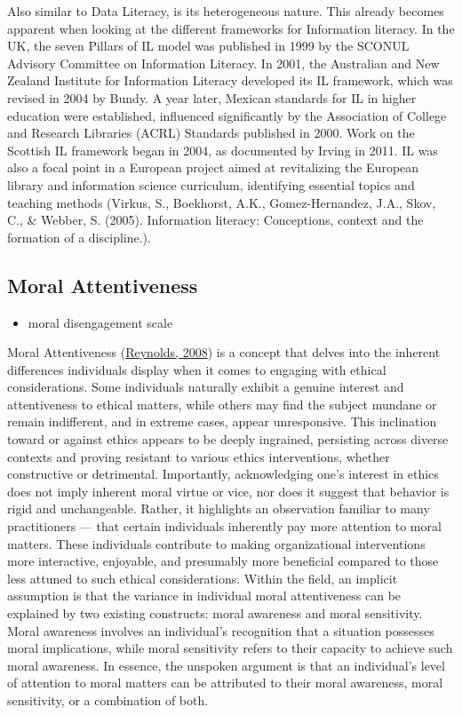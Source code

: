 \documentclass[
  12pt,
  a4paper,
  twoside]{article}
\providecommand{\tightlist}{%
  \setlength{\itemsep}{0pt}\setlength{\parskip}{0pt}}
\begin{document}
Also similar to Data Literacy, is its heterogeneous nature. This already becomes apparent when looking at the different frameworks for Information literacy. In the UK, the seven Pillars of IL model was published in 1999 by the SCONUL Advisory Committee on Information Literacy. In 2001, the Australian and New Zealand Institute for Information Literacy developed its IL framework, which was revised in 2004 by Bundy. A year later, Mexican standards for IL in higher education were established, influenced significantly by the Association of College and Research Libraries (ACRL) Standards published in 2000. Work on the Scottish IL framework began in 2004, as documented by Irving in 2011. IL was also a focal point in a European project aimed at revitalizing the European library and information science curriculum, identifying essential topics and teaching methods (Virkus, S., Boekhorst, A.K., Gomez-Hernandez, J.A., Skov, C., \& Webber, S. (2005). Information literacy: Conceptions, context and the formation of a discipline.).

\hypertarget{moral-attentiveness}{%
\subsection{Moral Attentiveness}\label{moral-attentiveness}}

\begin{itemize}
\tightlist
\item
  moral disengagement scale
\end{itemize}

Moral Attentiveness (\protect\hyperlink{ref-reynolds2008}{Reynolds, 2008}) is a concept that delves into the inherent differences individuals display when it comes to engaging with ethical considerations. Some individuals naturally exhibit a genuine interest and attentiveness to ethical matters, while others may find the subject mundane or remain indifferent, and in extreme cases, appear unresponsive. This inclination toward or against ethics appears to be deeply ingrained, persisting across diverse contexts and proving resistant to various ethics interventions, whether constructive or detrimental.
Importantly, acknowledging one's interest in ethics does not imply inherent moral virtue or vice, nor does it suggest that behavior is rigid and unchangeable. Rather, it highlights an observation familiar to many practitioners --- that certain individuals inherently pay more attention to moral matters. These individuals contribute to making organizational interventions more interactive, enjoyable, and presumably more beneficial compared to those less attuned to such ethical considerations.
Within the field, an implicit assumption is that the variance in individual moral attentiveness can be explained by two existing constructs: moral awareness and moral sensitivity. Moral awareness involves an individual's recognition that a situation possesses moral implications, while moral sensitivity refers to their capacity to achieve such moral awareness. In essence, the unspoken argument is that an individual's level of attention to moral matters can be attributed to their moral awareness, moral sensitivity, or a combination of both.
\end{document}
